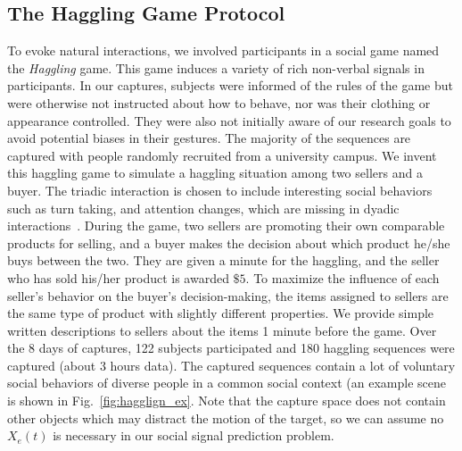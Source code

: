 \subsection{The Haggling Game Protocol}
To evoke natural interactions, we involved participants in a social game named the \emph{Haggling} game. This game induces a variety of rich non-verbal signals in participants. In our captures, subjects were informed of the rules of the game but were otherwise not instructed about how to behave, nor was their clothing or appearance controlled. They were also not initially aware of our research goals to avoid potential biases in their gestures. The majority of the sequences are captured with people randomly recruited from a university campus. We invent this haggling game to simulate a haggling situation among two sellers and a buyer. The triadic interaction is chosen to include interesting social behaviors such as turn taking, and attention changes, which are missing in dyadic interactions~\cite{rehg2013decoding}. During the game, two sellers are promoting their own comparable products for selling, and a buyer makes the decision about which product he/she buys between the two. They are given a minute for the haggling, and the seller who has sold his/her product is awarded $\$5$. To maximize the influence of each seller's behavior on the buyer's decision-making, the items assigned to sellers are the same type of product with slightly different properties. We provide simple written descriptions to sellers about the items 1 minute before the game. Over the 8 days of captures, 122 subjects participated and 180 haggling sequences were captured (about 3 hours data). The captured sequences contain a lot of voluntary social behaviors of diverse people in a common social context (an example scene is shown in Fig.~\ref{fig:hagglign_ex}. Note that the capture space does not contain other objects which may distract the motion of the target, so we can assume no $X_e(t)$ is necessary in our social signal prediction problem.

